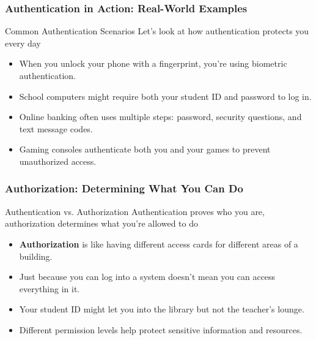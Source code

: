 \documentclass{beamer}
\begin{document}
\begin{frame}
    \frametitle{Authentication in Action: Real-World Examples}
    \begin{block}{Common Authentication Scenarios}
        Let's look at how authentication protects you every day
    \end{block}
    \begin{itemize}
        \item When you unlock your phone with a fingerprint, you're using biometric authentication.
        \item School computers might require both your student ID and password to log in.
        \item Online banking often uses multiple steps: password, security questions, and text message codes.
        \item Gaming consoles authenticate both you and your games to prevent unauthorized access.
    \end{itemize}
\end{frame}

\begin{frame}
    \frametitle{Authorization: Determining What You Can Do}
    \begin{block}{Authentication vs. Authorization}
        Authentication proves who you are, authorization determines what you're allowed to do
    \end{block}
    \begin{itemize}
        \item \textbf{Authorization} is like having different access cards for different areas of a building.
        \item Just because you can log into a system doesn't mean you can access everything in it.
        \item Your student ID might let you into the library but not the teacher's lounge.
        \item Different permission levels help protect sensitive information and resources.
    \end{itemize}
\end{frame}
\end{document}
